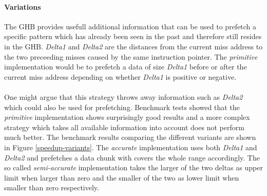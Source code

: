 \documentclass{article}
\begin{document}
\paragraph{Variations} The GHB provides usefull additional information that can be used to prefetch a specific pattern which has already been seen in the past and therefore still resides in the GHB. 
\textit{Delta1} and \textit{Delta2} are the distances from the current miss address to the two preceeding misses caused by the same instruction pointer. 
The \textit{primitive} implementation would be to prefetch a data of size \textit{Delta1} before or after the current miss address depending on whether \textit{Delta1} is positive or negative. \\\\
One might argue that this strategy throws away information such as \textit{Delta2} which could also be used for prefetching. 
Benchmark tests showed that the \textit{primitive} implementation shows surprisingly good results and a more complex strategy which takes all available information into account does not perform much better.
The benchmark results comparing the different variants are shown in Figure \ref{speedup-variants}. 
The \textit{accurate} implementation uses both \textit{Delta1} and \textit{Delta2} and prefetches a data chunk with covers the whole range accordingly. 
The so called \textit{semi-accurate} implementation takes the larger of the two deltas as upper limit when larger than zero and the smaller of the two as lower limit when smaller than zero respectively. 
\end{document}
